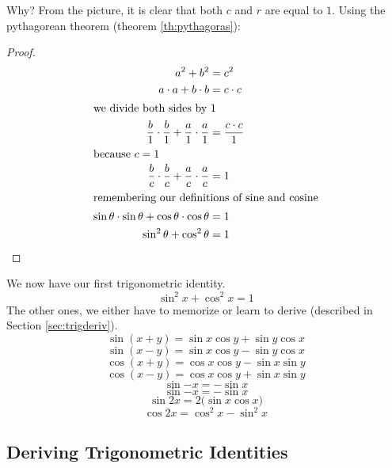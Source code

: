 Why? From the picture, it is clear that both $c$ and $r$ are equal to $1$. Using the pythagorean theorem (theorem \ref{th:pythagoras}):
\begin{proof}\begin{align*}
  a^2+b^2&=c^2\\
  a\cdot a + b \cdot b &= c \cdot c \\
  \intertext{we divide both sides by 1}
  \frac{b}{1}\cdot\frac{b}{1}+\frac{a}{1}\cdot\frac{a}{1}
  &=\frac{c \cdot c}{1}\\
  \intertext{because $c=1$}
  \frac{b}{c}\cdot\frac{b}{c}+\frac{a}{c}\cdot\frac{a}{c}
  &=1\\
  \intertext{remembering our definitions of sine and cosine}
  \sin\theta \cdot \sin\theta + \cos\theta \cdot \cos\theta &=1\\
  \sin^2\theta + \cos^2\theta &=1\qedhere
\end{align*}\end{proof}
We now have our first trigonometric identity.
\begin{equation}
  \sin^2x+\cos^2x=1
  \label{eq:pythtrig}
\end{equation}
The other ones, we either have to memorize or learn to derive (described in Section \ref{sec:trigderiv}).
\begin{equation}
  \sin{(x+y)} = \sin x \cos y + \sin y \cos x
\end{equation}
\begin{equation}
  \sin{(x-y)} = \sin x \cos y - \sin y \cos x
\end{equation}
\begin{equation}
  \cos(x+y)=\cos x \cos y - \sin x \sin y
  \label{eq:cosxpy}
\end{equation}
\begin{equation}
  \cos(x-y)=\cos x \cos y + \sin x \sin y
\end{equation}
\begin{equation}
  \sin{-x}=-\sin x
\end{equation}
\begin{equation}
  \sin{-x}=-\sin x
\end{equation}
\begin{equation}
  \sin{2x}=2 \big( \sin x \cos x \big)
\end{equation}
\begin{equation}
  \cos{2x}=\cos^2x-\sin^2x
\end{equation}

\subsection{Deriving Trigonometric Identities}\label{sec:trigderiv}

